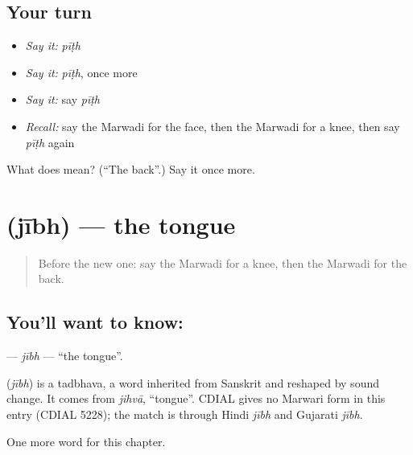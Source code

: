 \subsection*{Your turn}
\begin{itemize}
\raggedright
  \item \emph{Say it:} \emph{pīṭh}
  \item \emph{Say it:} \emph{pīṭh}, once more
  \item \emph{Say it:} say \emph{pīṭh}
  \item \emph{Recall:} say the Marwadi for the face, then the Marwadi for a knee, then say \emph{pīṭh} again
\end{itemize}

\begin{tcolorbox}[breakable,colback=teal!4,colframe=teal!35!black,title={Before you move on}]
What does  mean? (\textquotedblleft{}The back\textquotedblright{}.) Say it once more.
\end{tcolorbox}
\section[\texorpdfstring{\mw{जीभ} (jībh)}{जीभ (jībh)}]{ (jībh) — the tongue}

\label{lesson:MW-C46-jibh}



\begin{quote}
Before the new one: say the Marwadi for a knee, then the Marwadi for the back.
\end{quote}

\subsection*{You'll want to know: }
\textbf{} — \emph{jībh} — \textquotedblleft{}the tongue\textquotedblright{}.

\begin{cousinweb}
\textbf{} (\emph{jībh}) is a tadbhava, a word inherited from Sanskrit and reshaped by sound change. It comes from \emph{jihvā}, \textquotedblleft{}tongue\textquotedblright{}. CDIAL gives no Marwari form in this entry (CDIAL 5228); the match is through Hindi \emph{jībh} and Gujarati \emph{jībh}.
\end{cousinweb}

\begin{grammarlens}[title={What you've built}]
One more word for this chapter.
\end{grammarlens}


